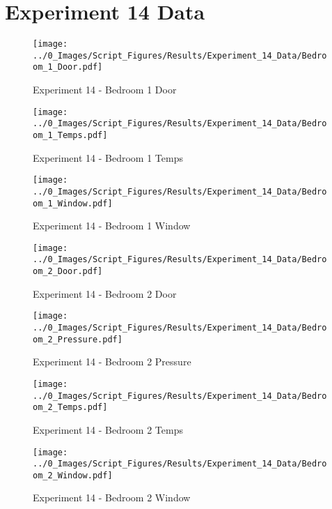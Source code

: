 \clearpage		\large
\section{Experiment 14 Data} \label{App:Exp14Results} 

	\begin{figure}[H]
		\centering
		\texttt{[image: ../0\_Images/Script\_Figures/Results/Experiment\_14\_Data/Bedroom\_1\_Door.pdf]}
		\caption[]{Experiment 14 - Bedroom 1 Door}
	\end{figure}
 

	\begin{figure}[H]
		\centering
		\texttt{[image: ../0\_Images/Script\_Figures/Results/Experiment\_14\_Data/Bedroom\_1\_Temps.pdf]}
		\caption[]{Experiment 14 - Bedroom 1 Temps}
	\end{figure}
 
	\clearpage

	\begin{figure}[H]
		\centering
		\texttt{[image: ../0\_Images/Script\_Figures/Results/Experiment\_14\_Data/Bedroom\_1\_Window.pdf]}
		\caption[]{Experiment 14 - Bedroom 1 Window}
	\end{figure}
 

	\begin{figure}[H]
		\centering
		\texttt{[image: ../0\_Images/Script\_Figures/Results/Experiment\_14\_Data/Bedroom\_2\_Door.pdf]}
		\caption[]{Experiment 14 - Bedroom 2 Door}
	\end{figure}
 
	\clearpage

	\begin{figure}[H]
		\centering
		\texttt{[image: ../0\_Images/Script\_Figures/Results/Experiment\_14\_Data/Bedroom\_2\_Pressure.pdf]}
		\caption[]{Experiment 14 - Bedroom 2 Pressure}
	\end{figure}
 

	\begin{figure}[H]
		\centering
		\texttt{[image: ../0\_Images/Script\_Figures/Results/Experiment\_14\_Data/Bedroom\_2\_Temps.pdf]}
		\caption[]{Experiment 14 - Bedroom 2 Temps}
	\end{figure}
 
	\clearpage

	\begin{figure}[H]
		\centering
		\texttt{[image: ../0\_Images/Script\_Figures/Results/Experiment\_14\_Data/Bedroom\_2\_Window.pdf]}
		\caption[]{Experiment 14 - Bedroom 2 Window}
	\end{figure}
 

